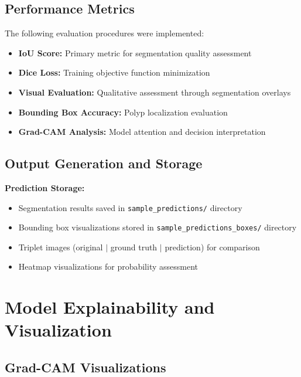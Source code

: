 \documentclass[a4paper,12pt]{report}
\begin{document}
\vspace{1em}

\subsection{Performance Metrics}

The following evaluation procedures were implemented:

\begin{itemize}
    \item \textbf{IoU Score:} Primary metric for segmentation quality assessment
    \item \textbf{Dice Loss:} Training objective function minimization
    \item \textbf{Visual Evaluation:} Qualitative assessment through segmentation overlays
    \item \textbf{Bounding Box Accuracy:} Polyp localization evaluation
    \item \textbf{Grad-CAM Analysis:} Model attention and decision interpretation
\end{itemize}

\vspace{1em}

\subsection{Output Generation and Storage}

\textbf{Prediction Storage:}
\begin{itemize}
    \item Segmentation results saved in \texttt{sample\_predictions/} directory
    \item Bounding box visualizations stored in \texttt{sample\_predictions\_boxes/} directory
    \item Triplet images (original $|$ ground truth $|$ prediction) for comparison
    \item Heatmap visualizations for probability assessment
\end{itemize}



\section{Model Explainability and Visualization}

\subsection{Grad-CAM Visualizations}
\end{document}
